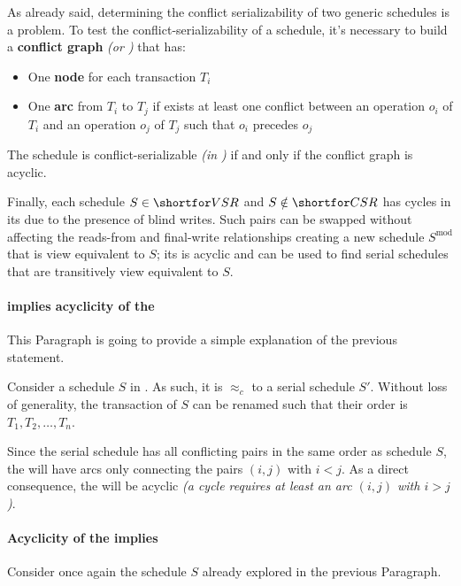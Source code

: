 \documentclass[english]{article}
\begin{document}
As already said, determining the conflict serializability of two generic schedules is a \NPC problem.
To test the conflict-serializability of a schedule, it's necessary to build a \textbf{conflict graph} \textit{(or \cg)} that has:

\begin{itemize}
  \item One \textbf{node} for each transaction \(T_i\)
  \item One \textbf{arc} from \(T_i\) to \(T_j\) if exists at least one conflict between an operation \(o_i\) of \(T_i\) and an operation \(o_j\) of \(T_j\) such that \(o_i\) precedes \(o_j\)
\end{itemize}

The schedule is conflict-serializable \textit{(in \csr)} if and only if the conflict graph is acyclic.

\bigskip
Finally, each schedule \(S \in \vsr\) and \(S \notin \csr\) has cycles in its \cg due to the presence of blind writes.
Such pairs can be swapped without affecting the reads-from and final-write relationships creating a new schedule \(S^\text{mod}\) that is view equivalent to \(S\);
its \cg is acyclic and can be used to find serial schedules that are transitively view equivalent to \(S\).

\paragraph{\csr implies acyclicity of the \cg}

This Paragraph is going to provide a simple explanation of the previous statement.

Consider a schedule \(S\) in \csr.
As such, it is \(\approx_c\) to a serial schedule \(S'\).
Without loss of generality, the transaction of \(S\) can be renamed such that their order is \(T_1, T_2, \dots, T_n\).

Since the serial schedule has all conflicting pairs in the same order as schedule \(S\), the \cg will have arcs only connecting the pairs \((i, j)\) with \(i < j\).
As a direct consequence, the \cg will be acyclic \textit{(a cycle requires at least an arc \((i, j)\) with \(i > j\))}.

\paragraph{Acyclicity of the \cg implies \csr}

Consider once again the schedule \(S\) already explored in the previous Paragraph.
\end{document}
